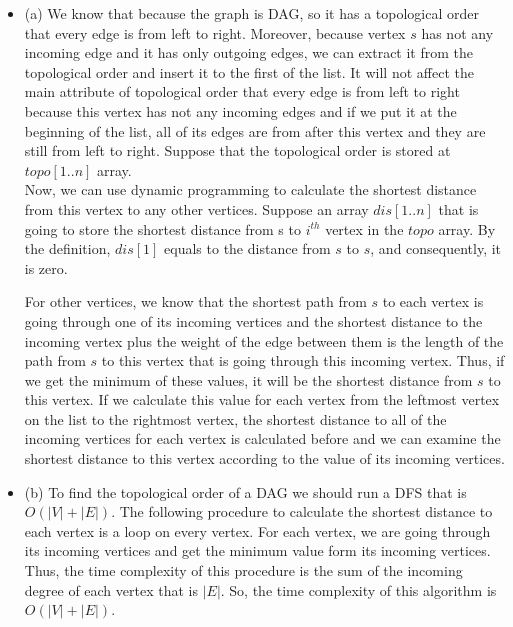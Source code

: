 \documentclass[12pt]{article}
\newenvironment{solution}[2][Solution]{\begin{trivlist}
\item[\hskip \labelsep {\bfseries #1}]}{\end{trivlist}}
\begin{document}
\begin{solution}{}
\begin{itemize}
\item (a) We know that because the graph is DAG, so it has a topological order
that every edge is from left to right. Moreover, because vertex $s$ has not any
incoming edge and it has only outgoing edges, we can extract it from the topological
order and insert it to the first of the list. It will not affect the main attribute
of topological order that every edge is from left to right because this vertex has
not any incoming edges and if we put it at the beginning of the list, all of its edges
are from after this vertex and they are still from left to right. Suppose that the 
topological order is stored at $topo[1..n]$ array.
\\
Now, we can use dynamic programming to calculate the shortest distance from this vertex
to any other vertices. Suppose an array $dis[1..n]$ that is going to store the shortest
distance from s to $i^{th}$ vertex in the $topo$ array. By the definition, $dis[1]$ equals
to the distance from $s$ to $s$, and consequently, it is zero.

For other vertices, we know that the shortest path from $s$ to each vertex is going
through one of its incoming vertices and the shortest distance to the incoming vertex
plus the weight of the edge between them is the length of the path from $s$ to this vertex
that is going through this incoming vertex. Thus, if we get the minimum of these values,
it will be the shortest distance from $s$ to this vertex. If we calculate this value for
each vertex from the leftmost vertex on the list to the rightmost vertex, the shortest
distance to all of the incoming vertices for each vertex is calculated before and we can
examine the shortest distance to this vertex according to the value of its incoming
vertices.

\item (b) To find the topological order of a DAG we should run a DFS that is $O(|V|+|E|)$.
The following procedure to calculate the shortest distance to each vertex is a loop on every
vertex. For each vertex, we are going through its incoming vertices and get the minimum
value form its incoming vertices. Thus, the time complexity of this procedure is the sum of
the incoming degree of each vertex that is $|E|$. So, the time complexity of this algorithm
is $O(|V|+|E|)$.


\end{itemize}
\end{solution}
\end{document}
